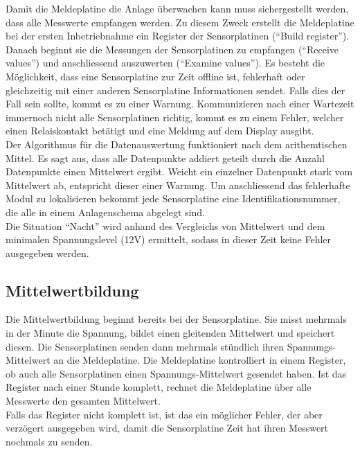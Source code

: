 \newpage

Damit die Meldeplatine die Anlage überwachen kann muss sichergestellt werden, dass alle Messwerte empfangen werden. Zu diesem Zweck erstellt die Meldeplatine bei der ersten Inbetriebnahme ein Register der Sensorplatinen (``Build register''). Danach beginnt sie die Messungen der Sensorplatinen zu empfangen (``Receive values'') und anschliessend auszuwerten (``Examine values''). Es besteht die Möglichkeit, dass eine Sensorplatine zur Zeit offline ist, fehlerhaft oder gleichzeitig mit einer anderen Sensorplatine Informationen sendet. Falls dies der Fall sein sollte, kommt es zu einer Warnung. Kommunizieren nach einer Wartezeit immernoch nicht alle Sensorplatinen richtig, kommt es zu einem Fehler, welcher einen Relaiskontakt betätigt und eine Meldung auf dem Display ausgibt.\\
Der Algorithmus für die Datenauswertung funktioniert nach dem arithemtischen Mittel. Es sagt aus, dass alle Datenpunkte addiert geteilt durch die Anzahl Datenpunkte einen Mittelwert ergibt. Weicht ein einzelner Datenpunkt stark vom Mittelwert ab, entspricht dieser einer Warnung. Um anschliessend das fehlerhafte Modul zu lokalisieren bekommt jede Sensorplatine eine Identifikationsnummer, die alle in einem Anlagenschema abgelegt sind.\\

Die Situation ``Nacht'' wird anhand des Vergleichs von Mittelwert und dem minimalen Spannungslevel (12V) ermittelt, sodass in dieser Zeit keine Fehler ausgegeben werden.


\subsection{Mittelwertbildung}
Die Mittelwertbildung beginnt bereits bei der Sensorplatine. Sie misst mehrmals in der Minute die Spannung, bildet einen gleitenden Mittelwert und speichert diesen. Die Sensorplatinen senden dann mehrmals stündlich ihren Spannungs-Mittelwert an die Meldeplatine. Die Meldeplatine kontrolliert in einem Register, ob auch alle Sensorplatinen einen Spannungs-Mittelwert gesendet haben. Ist das Register nach einer Stunde komplett, rechnet die Meldeplatine über alle Messwerte den gesamten Mittelwert.\\
Falls das Register nicht komplett ist, ist das ein möglicher Fehler, der aber verzögert ausgegeben wird, damit die Sensorplatine Zeit hat ihren Messwert nochmals zu senden.
%